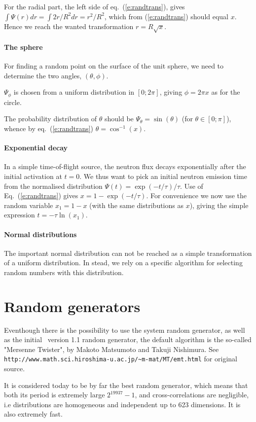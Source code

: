 For the radial part, the left side of eq.~(\ref{e:randtrans}), gives
$\int \Psi(r) dr = \int 2 r/R^2 dr = r^2/R^2$,
which from (\ref{e:randtrans}) should equal $x$.
Hence we reach the wanted transformation $r = R\sqrt{x}$.

\paragraph{The sphere}
For finding a random point on the surface of the unit sphere,
we need to determine the two angles, $(\theta, \phi)$.

$\Psi_\phi$ is chosen from a uniform distribution
in $[0; 2\pi]$, giving $\phi = 2\pi x$ as for the circle.

The probability distribution of $\theta$ should be
$\Psi_\theta=\sin(\theta)$ (for $\theta \in [0; \pi ]$),
whence by eq.~(\ref{e:randtrans}) $\theta=\cos^{-1}(x)$.

\paragraph{Exponential decay}
In a simple time-of-flight source, the neutron flux decays exponentially
after the initial activation at $t=0$. We thus want to pick an initial
neutron emission time from the normalised distribution
$\Psi(t) = \exp(-t/\tau) / \tau$.
Use of Eq.~(\ref{e:randtrans}) gives
$x = 1 - \exp(-t/\tau)$. For convenience we now use the random variable
$x_1 = 1-x$ (with the same distributions as $x$),
giving the simple expression $t = - \tau \ln (x_1)$.

\paragraph{Normal distributions}
The important normal distribution can not be reached as a simple
transformation of a uniform distribution.
In stead, we rely on a specific algorithm for selecting random
numbers with this distribution.

\section{Random generators}
Eventhough there is the possibility to use the system random generator, as well as the initial \MCS\ version 1.1 random generator, the default algorithm is the so-called "Mersenne Twister", by Makoto Matsumoto and Takuji Nishimura. See \verb+http://www.math.sci.hiroshima-u.ac.jp/~m-mat/MT/emt.html+ for original source.

It is considered today to be by far the best random generator, which means that both its period is extremely large $2^{19937}-1$, and cross-correlations are negligible, i.e distributions are homogeneous and independent up to 623 dimensions. It is also extremely fast.
